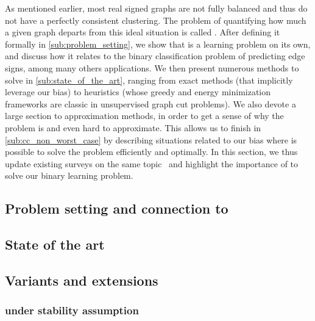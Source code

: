 As mentioned earlier, most real signed graphs are not fully balanced and thus do not have a
perfectly consistent clustering. The problem of quantifying how much a given graph departs from this
ideal situation is called \pcc{}. After defining it formally in \autoref{sub:problem_setting}, we
show that \pcc{} is a learning problem on its own, and discuss how it relates to the binary
classification problem of predicting edge signs, among many others applications. We then present
numerous methods to solve \pcc{} in \autoref{sub:state_of_the_art}, ranging from exact methods (that
implicitly leverage our bias) to heuristics (whose greedy and energy minimization frameworks are
classic in unsupervised graph cut problems). We also devote a large section to approximation
methods, in order to get a sense of why the problem is \NPc{} and even hard to approximate. This
allows us to finish in
\autoref{sub:cc_non_worst_case} by describing situations related to our bias where is possible to
solve the problem efficiently and optimally. In this section, we thus update existing surveys on the same
topic~\autocites{bonchi2014correlation}{surveyCC16}{CCWirth2017} and highlight the importance of
\pcc{} to solve our binary learning problem.


\subsection{Problem setting and connection to \esp{}}
\label{sub:problem_setting}


\subsection{State of the art}
\label{sub:state_of_the_art}



\subsection{Variants and extensions}
\label{sub:variants_and_extensions}


\subsubsection{\pcc{} under stability assumption}
\label{ssub:cc_under_stability_assumption}

